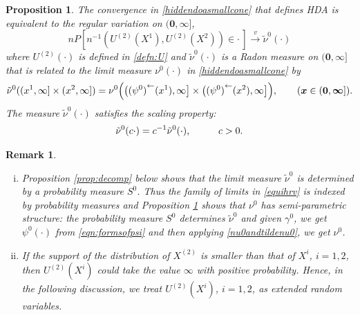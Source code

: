 \documentclass[11 pt]{amsart}
\newtheorem{prop}[thm]{Proposition}
\newtheorem{rem}[thm]{Remark}
\numberwithin{equation}{section}
\begin{document}
\begin{prop}\label{prop:equihrv}
{The convergence in \eqref{hiddendoasmallcone} that defines HDA is
  equivalent to the regular variation on $({\boldsymbol 0}, {\boldsymbol \infty}]$, 
\begin{equation}\label{equihrv}
nP\left[ n^{-1}\left( {U^{(2)}(X^1)}, {U^{(2)}(X^2)} \right)
  \in \cdot \,\right] \stackrel{v}{\rightarrow} \tilde \nu^0(\cdot) 
\end{equation}
where $U^{(2)}(\cdot)$ is defined in
\eqref{defn:U} and $\tilde \nu^0(\cdot)$ is a Radon measure on $({\boldsymbol 0},
{\boldsymbol \infty}]$ that is related to the
limit measure  $\nu^0(\cdot)$  in \eqref{hiddendoasmallcone} by
\begin{equation}\label{nu0andtildenu0} 
\tilde \nu^0((x^1, \infty] \times (x^2, \infty] ) = 
\nu^0 \Bigl(
\bigl({(\psi^0 )}^{\leftarrow}(x^1), \infty \bigr]
  \times \bigl({(\psi^0 )}^{\leftarrow}(x^2), \infty
  \bigr] \Bigr), \qquad ({\boldsymbol x} \in ({\boldsymbol 0}, {\boldsymbol \infty}]).
\end{equation}
The measure $\tilde \nu^0(\cdot)$ satisfies the scaling property:
\begin{align}\label{scaling_nu0tilde}
\tilde \nu^0( c \cdot) = c^{-1} \tilde \nu^0( \cdot), \hskip 1 cm c > 0.
\end{align}
}
\end{prop}

\begin{rem}
{\rm{ 
\begin{enumerate}[(i)]
\item {Proposition \ref{prop:decomp} below shows} 
that the limit measure $\tilde \nu^0$ is
 determined by a probability measure $S^0$. Thus
the family of limits in \eqref{equihrv} is indexed by probability
measures and  Proposition \ref{prop:equihrv} shows that $\nu^0$ has semi-parametric structure:  the
  probability measure $S^0$ 
 determine{s} $\tilde \nu^0$ and given  $\gamma^0$,
  we  {get}  $\psi^0(\cdot)$ from
  \eqref{eqn:formsofpsi} and then 
applying \eqref{nu0andtildenu0}, we get
$ \nu^0$. 

\item {I}f the support of the distribution of $X^{(2)}$ is smaller
  than that of $X^i$, $i = 1, 2$, then $U^{(2)}(X^i)$ could take the
  value $\infty$ with positive probability. Hence, in the following
  discussion, we treat $U^{(2)}(X^i)$, $i = 1, 2$, as extended random
  variables.
\end{enumerate}
}}
\end{rem}
\end{document}
